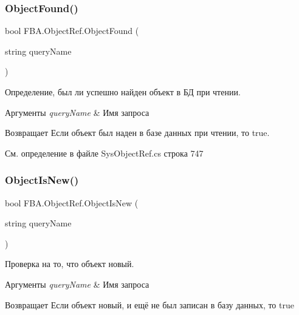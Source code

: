 \mbox{\label{class_f_b_a_1_1_object_ref_a1027bbbceec20212701d6e3a49476a4c}} 
\subsubsection{\texorpdfstring{Object\+Found()}{ObjectFound()}}
{\footnotesize\ttfamily bool F\+B\+A.\+Object\+Ref.\+Object\+Found (\begin{DoxyParamCaption}\item[{string}]{query\+Name }\end{DoxyParamCaption})}



Определение, был ли успешно найден объект в БД при чтении. 


\begin{DoxyParams}{Аргументы}
{\em query\+Name} & Имя запроса\\
\hline
\end{DoxyParams}
\begin{DoxyReturn}{Возвращает}
Если объект был наден в базе данных при чтении, то true.
\end{DoxyReturn}


См. определение в файле Sys\+Object\+Ref.\+cs строка 747

\mbox{\label{class_f_b_a_1_1_object_ref_aae6a881f8e59f323cbd67b9bd426888a}} 
\subsubsection{\texorpdfstring{Object\+Is\+New()}{ObjectIsNew()}}
{\footnotesize\ttfamily bool F\+B\+A.\+Object\+Ref.\+Object\+Is\+New (\begin{DoxyParamCaption}\item[{string}]{query\+Name }\end{DoxyParamCaption})}



Проверка на то, что объект новый. 


\begin{DoxyParams}{Аргументы}
{\em query\+Name} & Имя запроса\\
\hline
\end{DoxyParams}
\begin{DoxyReturn}{Возвращает}
Если объект новый, и ещё не был записан в базу данных, то true
\end{DoxyReturn}


